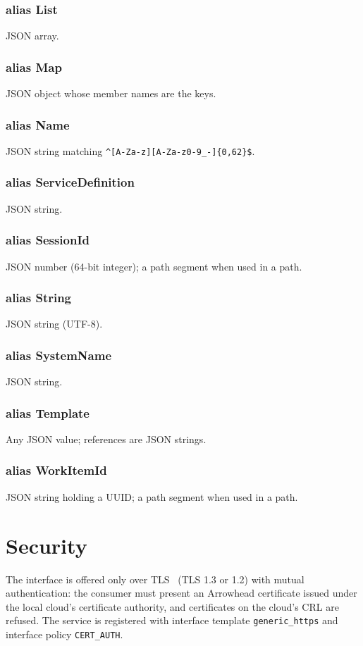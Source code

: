 \documentclass[a4paper]{arrowhead}
\newcommand{\pdef}[1]{{\textcolor{ArrowheadGrey}{#1\label{sec:model:primitives:#1}\label{sec:model:primitives:#1s}}}}
\begin{document}
\subsubsection*{alias \pdef{List}}
JSON array.

\subsubsection*{alias \pdef{Map}}
JSON object whose member names are the keys.

\subsubsection*{alias \pdef{Name}}
JSON string matching \texttt{\^{}[A-Za-z][A-Za-z0-9\_-]\{0,62\}\$}.

\subsubsection*{alias \pdef{ServiceDefinition}}
JSON string.

\subsubsection*{alias \pdef{SessionId}}
JSON number (64-bit integer); a path segment when used in a path.

\subsubsection*{alias \pdef{String}}
JSON string (UTF-8).

\subsubsection*{alias \pdef{SystemName}}
JSON string.

\subsubsection*{alias \pdef{Template}}
Any JSON value; references are JSON strings.

\subsubsection*{alias \pdef{WorkItemId}}
JSON string holding a UUID; a path segment when used in a path.



\section{Security}
\label{sec:security}
The interface is offered only over TLS~\cite{rfc8446} (TLS 1.3 or 1.2) with mutual authentication: the consumer must
present an Arrowhead certificate issued under the local cloud's certificate authority, and certificates on the
cloud's CRL are refused. The service is registered with interface template \texttt{generic\_\allowbreak{}https} and interface
policy \texttt{CERT\_AUTH}.
\end{document}
